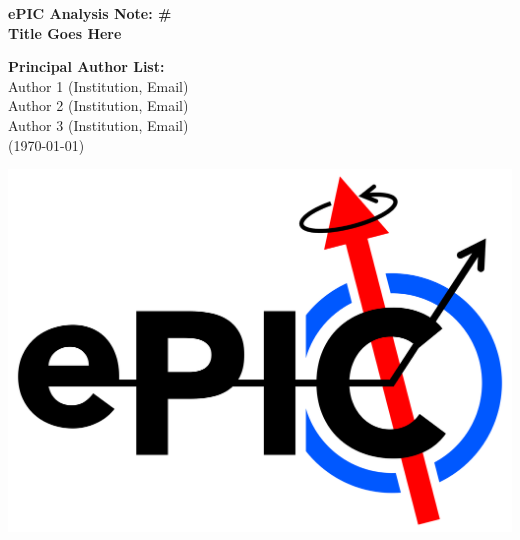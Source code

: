 %
\vspace*{0.1cm}
\begin{center}
{\bf\Large ePIC Analysis Note: \# } \\
\vspace*{1.0cm}
{\bf\Large Title Goes Here} \\
\end{center}
%
\vspace*{0.1cm}
%
\begin{center}
{\bf Principal Author List:} \\ 
\vspace*{0.15cm}
Author 1 (Institution, Email)\\
Author 2 (Institution, Email)\\
Author 3 (Institution, Email)\\
\vspace*{0.5cm}
(\today)
\end{center}



\vfill
\begin{center}
{\includegraphics[width=0.4\linewidth]{2560px-EPIC-logo_black_transparent.png}}
\end{center}
\vfill


\pagebreak
%
\begin{abstract}
\noindent \textit{Abstract for analysis note goes here.}
\end{abstract}
